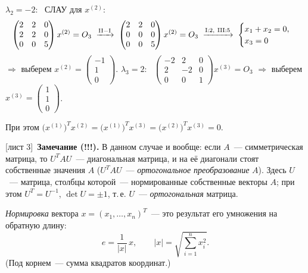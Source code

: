 \documentclass[a4paper,11pt]{article}
\newcommand{\hwlist}[1]{{\small\color{gray}[#1]}}
\newcommand{\gauss}[2][]{\;\xrightarrow[\scriptstyle #1]{\scriptstyle #2}\;}
\begin{document}
\begin{enumerate}[label=\arabic*.]
$\lambda_2=-2$: \ СЛАУ для $x^{(2)}$:
\[
\begin{pmatrix}2&2&0\\2&2&0\\0&0&5\end{pmatrix}x^{(2)}=O_3
\gauss{\text{II}-\text{I}}
\begin{pmatrix}2&2&0\\0&0&0\\0&0&5\end{pmatrix}x^{(2)}=O_3
\gauss{\text{I}:2,\ \text{III}:5}
\begin{cases}x_1+x_2=0,\\x_3=0\end{cases}
\]
$\Rightarrow$ выберем $x^{(2)}=\begin{pmatrix}-1\\1\\0\end{pmatrix}$.
$\lambda_3=2$: \ $\begin{pmatrix}-2&2&0\\2&-2&0\\0&0&1\end{pmatrix}x^{(3)}=O_3$ $\Rightarrow$ выберем
$x^{(3)}=\begin{pmatrix}1\\1\\0\end{pmatrix}$.

При этом $\bigl(x^{(1)}\bigr)^Tx^{(2)}=\bigl(x^{(1)}\bigr)^Tx^{(3)}=\bigl(x^{(2)}\bigr)^Tx^{(3)}=0$.
\end{enumerate}

\hwlist{лист 3}\ \textbf{Замечание (!!!).} В данном случае и вообще: если $A$~--- симметрическая
матрица, то $U^TAU$~--- диагональная матрица, и на её диагонали стоят собственные значения $A$
($U^TAU$~--- \emph{ортогональное преобразование} $A$). Здесь $U$~--- матрица, столбцы которой~---
нормированные собственные векторы $A$; при этом $U^T=U^{-1}$, $\det U=\pm1$, т.\,е. $U$~---
\emph{ортогональная} матрица.

\emph{Нормировка} вектора $x=(x_1,\dots,x_n)^T$~--- это результат его умножения на обратную длину:
\[
e=\frac{1}{|x|}\,x,\qquad |x|=\sqrt{\textstyle\sum_{i=1}^{n}x_i^2}.
\]
\vspace{-2pt}(Под корнем~--- сумма квадратов координат.)
\end{document}
